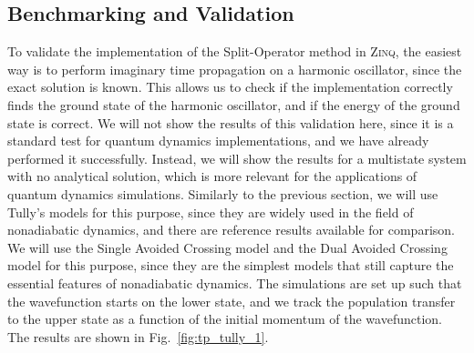 \subsection{Benchmarking and Validation}
To validate the implementation of the Split-Operator method in \textsc{Zinq}, the easiest way is to perform imaginary time propagation on a harmonic oscillator, since the exact solution is known. This allows us to check if the implementation correctly finds the ground state of the harmonic oscillator, and if the energy of the ground state is correct. We will not show the results of this validation here, since it is a standard test for quantum dynamics implementations, and we have already performed it successfully. Instead, we will show the results for a multistate system with no analytical solution, which is more relevant for the applications of quantum dynamics simulations. Similarly to the previous section, we will use Tully's models\supercite{10.1063/1.459170} for this purpose, since they are widely used in the field of nonadiabatic dynamics, and there are reference results available for comparison. We will use the Single Avoided Crossing model and the Dual Avoided Crossing model for this purpose, since they are the simplest models that still capture the essential features of nonadiabatic dynamics. The simulations are set up such that the wavefunction starts on the lower state, and we track the population transfer to the upper state as a function of the initial momentum of the wavefunction. The results are shown in Fig.~\ref{fig:tp_tully_1}.

